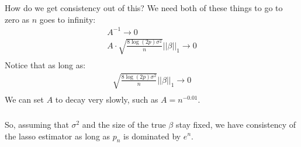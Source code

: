 \begin{frame}[fragile] \frametitle{}

How do we get consistency out of this? We need both of these things to
go to zero as $n$ goes to infinity:
\begin{align*}
A^{-1} \rightarrow 0 \\
A \cdot \sqrt{\frac{8 \log(2p) \sigma^2}{n}} || \beta ||_1 \rightarrow 0 \\
\end{align*}
\pause Notice that as long as:
\begin{align*}
\sqrt{\frac{8 \log(2p) \sigma^2}{n}} || \beta ||_1 \rightarrow 0 \\
\end{align*}
We can set $A$ to decay very slowly, such as $A = n^{-0.01}$.

\end{frame}

\begin{frame}[fragile] \frametitle{}

So, assuming that $\sigma^2$ and the size of the true $\beta$ stay fixed,
we have consistency of the lasso estimator as long as $p_n$ is dominated
by $e^n$.

\end{frame}













